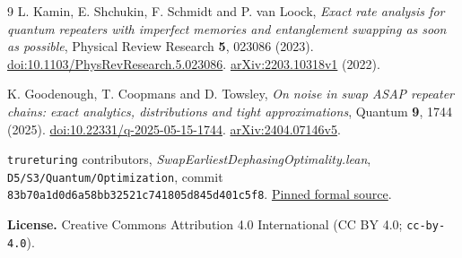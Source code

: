 \documentclass[11pt,a4paper]{article}
\begin{document}
\begin{thebibliography}{9}
L. Kamin, E. Shchukin, F. Schmidt and P. van Loock,
\emph{Exact rate analysis for quantum repeaters with imperfect memories
and entanglement swapping as soon as possible},
Physical Review Research \textbf{5}, 023086 (2023).
\href{https://doi.org/10.1103/PhysRevResearch.5.023086}{doi:10.1103/PhysRevResearch.5.023086}.
\href{https://arxiv.org/abs/2203.10318v1}{arXiv:2203.10318v1} (2022).

K. Goodenough, T. Coopmans and D. Towsley,
\emph{On noise in swap ASAP repeater chains: exact analytics,
distributions and tight approximations},
Quantum \textbf{9}, 1744 (2025).
\href{https://doi.org/10.22331/q-2025-05-15-1744}{doi:10.22331/q-2025-05-15-1744}.
\href{https://arxiv.org/abs/2404.07146v5}{arXiv:2404.07146v5}.

\texttt{trureturing} contributors,
\emph{SwapEarliestDephasingOptimality.lean},
\texttt{D5/S3/Quantum/Optimization}, commit
\texttt{83b70a1d0d6a58bb32521c741805d845d401c5f8}.
\href{https://github.com/the-omega-institute/trureturing/blob/83b70a1d0d6a58bb32521c741805d845d401c5f8/D5/S3/Quantum/Optimization/SwapEarliestDephasingOptimality.lean}{Pinned formal source}.
\end{thebibliography}

\medskip\noindent
\textbf{License.} Creative Commons Attribution 4.0 International
(CC BY 4.0; \texttt{cc-by-4.0}).
\end{document}
